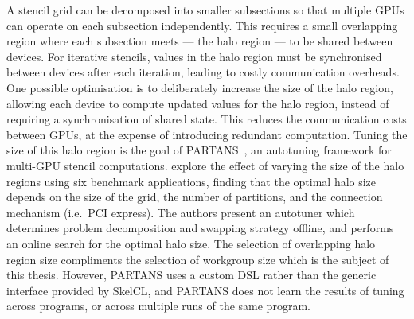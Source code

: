 \documentclass[nonatbib,preprint,10pt]{sigplanconf}
\begin{document}
A stencil grid can be decomposed into smaller subsections so that
multiple GPUs can operate on each subsection independently. This
requires a small overlapping region where each subsection meets ---
the halo region --- to be shared between devices. For iterative
stencils, values in the halo region must be synchronised between
devices after each iteration, leading to costly communication
overheads. One possible optimisation is to deliberately increase the
size of the halo region, allowing each device to compute updated
values for the halo region, instead of requiring a synchronisation of
shared state. This reduces the communication costs between GPUs, at
the expense of introducing redundant computation. Tuning the size of
this halo region is the goal of PARTANS~\cite{Lutz2013}, an autotuning
framework for multi-GPU stencil computations. \citeauthor{Lutz2013}
explore the effect of varying the size of the halo regions using six
benchmark applications, finding that the optimal halo size depends on
the size of the grid, the number of partitions, and the connection
mechanism (i.e.\ PCI express). The authors present an autotuner which
determines problem decomposition and swapping strategy offline, and
performs an online search for the optimal halo size. The selection of
overlapping halo region size compliments the selection of workgroup
size which is the subject of this thesis. However, PARTANS uses a
custom DSL rather than the generic interface provided by SkelCL, and
PARTANS does not learn the results of tuning across programs, or
across multiple runs of the same program.



\end{document}
